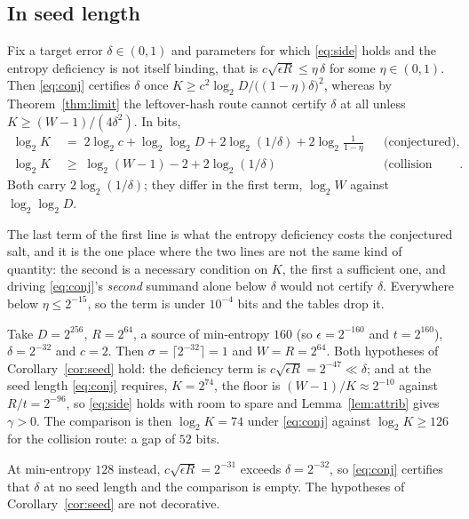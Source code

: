 \documentclass{aicr-solution}
\begin{document}
\subsection*{In seed length}

\begin{corollary}\label{cor:seed}
Fix a target error $\delta \in (0,1)$ and parameters for which \eqref{eq:side} holds and the entropy
deficiency is not itself binding, that is $c\sqrt{\epsilon R} \le \eta\,\delta$ for some
$\eta \in (0,1)$. Then \eqref{eq:conj} certifies $\delta$ once
$K \ge c^{2}\log_2 D/\bigl((1-\eta)\delta\bigr)^{2}$, whereas by
Theorem~\ref{thm:limit} the leftover-hash route cannot certify $\delta$ at all unless
$K \ge (W-1)/(4\delta^{2})$. In bits,
\[
  \begin{aligned}
    \log_2 K \;&=\;    2\log_2 c + \log_2\log_2 D + 2\log_2(1/\delta)
                       + 2\log_2\tfrac{1}{1-\eta}                     && \text{(conjectured)}, \\
    \log_2 K \;&\ge\;  \log_2(W-1) - 2 + 2\log_2(1/\delta)            && \text{(collision route)} .
  \end{aligned}
\]
Both carry $2\log_2(1/\delta)$; they differ in the first term, $\log_2 W$ against
$\log_2\log_2 D$.
\end{corollary}

The last term of the first line is what the entropy deficiency costs the conjectured salt, and it
is the one place where the two lines are not the same kind of quantity: the second is a necessary
condition on $K$, the first a sufficient one, and driving \eqref{eq:conj}'s \emph{second} summand
alone below $\delta$ would not certify $\delta$. Everywhere below $\eta \le 2^{-15}$, so the term
is under $10^{-4}$ bits and the tables drop it.

\begin{remark}\label{rem:numbers}
Take $D = 2^{256}$, $R = 2^{64}$, a source of min-entropy $160$ (so $\epsilon = 2^{-160}$ and
$t = 2^{160}$), $\delta = 2^{-32}$ and $c = 2$. Then $\sigma = \lceil 2^{-32}\rceil = 1$ and
$W = R = 2^{64}$. Both hypotheses of Corollary~\ref{cor:seed} hold: the deficiency term is
$c\sqrt{\epsilon R} = 2^{-47} \ll \delta$; and at the seed length \eqref{eq:conj} requires,
$K = 2^{74}$, the floor is $(W-1)/K \approx 2^{-10}$ against $R/t = 2^{-96}$, so \eqref{eq:side}
holds with room to spare and Lemma~\ref{lem:attrib} gives $\gamma > 0$. The comparison is then
$\log_2 K = 74$ under \eqref{eq:conj} against $\log_2 K \ge 126$ for the collision route: a gap of
$52$ bits.

At min-entropy $128$ instead, $c\sqrt{\epsilon R} = 2^{-31}$ exceeds $\delta = 2^{-32}$, so
\eqref{eq:conj} certifies that $\delta$ at no seed length and the comparison is empty. The
hypotheses of Corollary~\ref{cor:seed} are not decorative.
\end{remark}
\end{document}

